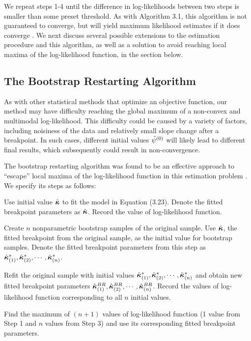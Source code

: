 \documentclass [12pt, proquest] {uwthesis}[2016/11/22]
\begin{document}
We repeat steps 1-4 until the difference in log-likelihoods between two steps is smaller than some preset threshold. As with Algorithm 3.1, this algorithm is not guaranteed to converge, but will yield maximum likelihood estimates if it does converge \cite{VM2014}. We next discuss several possible extensions to the estimation procedure and this algorithm, as well as a solution to avoid reaching local maxima of the log-likelihood function, in the section below.

\subsection{The Bootstrap Restarting Algorithm}

As with other statistical methods that optimize an objective function, our method may have difficulty reaching the global maximum of a non-convex and multimodal log-likelihood. This difficulty could be caused by a variety of factors, including noisiness of the data and relatively small slope change after a breakpoint. In such cases, different initial values $\Tilde{\psi}^{(0)}$ will likely lead to different final results, which subsequently could result in non-convergence. 

The bootstrap restarting algorithm was found to be an effective approach to ``escape'' local maxima of the log-likelihood function in this estimation problem \cite{VM2003, SW2001}. We specify its steps as follows:
\begin{enumerate}
\begin{mybox}
    \item Use initial value $\Tilde{\bm{\kappa}}$ to fit the model in Equation (3.23). Denote the fitted breakpoint parameters as $\Hat{\bm{\kappa}}$. Record the value of log-likelihood function.
    \item Create $n$ nonparametric bootstrap samples of the original sample. Use $\Hat{\bm{\kappa}}$, the fitted breakpoint from the original sample, as the initial value for bootstrap samples. Denote the fitted breakpoint parameters from this step as $\Hat{\bm{\kappa}}^*_{(1)}, \Hat{\bm{\kappa}}^*_{(2)}, \cdots, \Hat{\bm{\kappa}}^*_{(n)}$.
    \item Refit the original sample with initial values $\Hat{\bm{\kappa}}^*_{(1)}, \Hat{\bm{\kappa}}^*_{(2)}, \cdots, \Hat{\bm{\kappa}}^*_{(n)}$ and obtain new fitted breakpoint parameters $\Hat{\bm{\kappa}}^{BR}_{(1)}, \Hat{\bm{\kappa}}^{BR}_{(2)}, \cdots, \Hat{\bm{\kappa}}^{BR}_{(n)}$. Record the values of log-likelihood function corresponding to all $n$ initial values.
    \item Find the maximum of $(n+1)$ values of log-likelihood function (1 value from Step 1 and $n$ values from Step 3) and use its corresponding fitted breakpoint parameters.
\end{mybox}
\end{enumerate}
\end{document}
